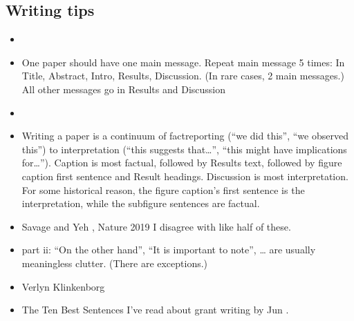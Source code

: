 \documentclass[letterpaper,10pt,english]{sphinxmanual}
\begin{document}
\subsection{Writing tips}
\label{\detokenize{PaperWritingTips:writing-tips}}\begin{itemize}
\item {} 
\sphinxAtStartPar
{}

\item {} 
\sphinxAtStartPar
One paper should have one main message. Repeat main message 5 times: In Title, Abstract, Intro, Results, Discussion. (In rare cases, 2 main messages.) All other messages go in Results and Discussion

\item {} 
\sphinxAtStartPar
{}

\item {} 
\sphinxAtStartPar
Writing a paper is a continuum of fact\sphinxhyphen{}reporting (“we did this”, “we observed this”) to interpretation (“this suggests that…”, “this might have implications for…”). Caption is most factual, followed by Results text, followed by figure caption first sentence and Result headings. Discussion is most interpretation. For some historical reason, the figure caption’s first sentence is the interpretation, while the subfigure sentences are factual.

\item {} 
\sphinxAtStartPar
Savage and Yeh , Nature 2019 I disagree with like half of these.

\item {} 
\sphinxAtStartPar
{} part ii: “On the other hand”, “It is important to note”, … are usually meaningless clutter. (There are exceptions.)

\item {} 
\sphinxAtStartPar
Verlyn Klinkenborg 

\item {} 
\sphinxAtStartPar
The Ten Best Sentences I’ve read about grant writing by Jun .

\end{itemize}
\end{document}

